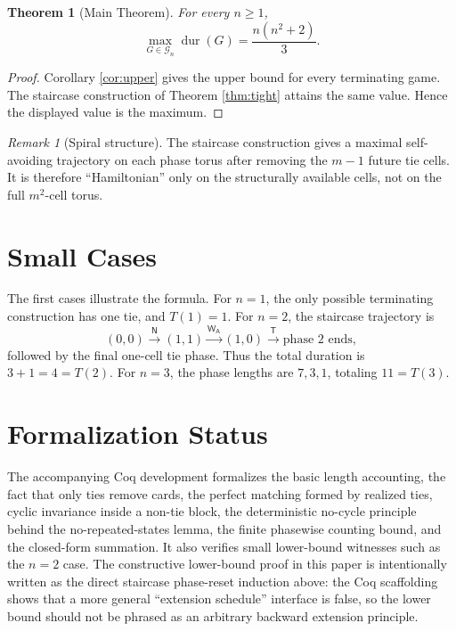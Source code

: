 \documentclass[11pt]{article}
\newtheorem{theorem}{Theorem}
\theoremstyle{definition}
\theoremstyle{remark}
\newtheorem{remark}{Remark}
\DeclareMathOperator{\dur}{dur}
\newcommand{\WA}{\mathsf{W_A}}
\newcommand{\TT}{\mathsf{T}}
\newcommand{\NN}{\mathsf{N}}
\begin{document}
\begin{theorem}[Main Theorem]\label{thm:main}
For every $n\ge 1$,
\[
\max_{G\in\mathcal G_n}\dur(G)=\frac{n(n^2+2)}{3}.
\]
\end{theorem}
\begin{proof}
Corollary \ref{cor:upper} gives the upper bound for every terminating game. The staircase construction of Theorem \ref{thm:tight} attains the same value. Hence the displayed value is the maximum.
\end{proof}

\begin{remark}[Spiral structure]\label{rem:spiral}
The staircase construction gives a maximal self-avoiding trajectory on each phase torus after removing the $m-1$ future tie cells. It is therefore ``Hamiltonian'' only on the structurally available cells, not on the full $m^2$-cell torus.
\end{remark}

\section{Small Cases}\label{sec:small_cases}
The first cases illustrate the formula. For $n=1$, the only possible terminating construction has one tie, and $T(1)=1$. For $n=2$, the staircase trajectory is
\[
(0,0)\xrightarrow{\NN}(1,1)\xrightarrow{\WA}(1,0)\xrightarrow{\TT}\text{phase }2\text{ ends},
\]
followed by the final one-cell tie phase. Thus the total duration is $3+1=4=T(2)$. For $n=3$, the phase lengths are $7,3,1$, totaling $11=T(3)$.

\section{Formalization Status}\label{sec:formalization}
The accompanying Coq development formalizes the basic length accounting, the fact that only ties remove cards, the perfect matching formed by realized ties, cyclic invariance inside a non-tie block, the deterministic no-cycle principle behind the no-repeated-states lemma, the finite phasewise counting bound, and the closed-form summation. It also verifies small lower-bound witnesses such as the $n=2$ case. The constructive lower-bound proof in this paper is intentionally written as the direct staircase phase-reset induction above: the Coq scaffolding shows that a more general ``extension schedule'' interface is false, so the lower bound should not be phrased as an arbitrary backward extension principle.
\end{document}
